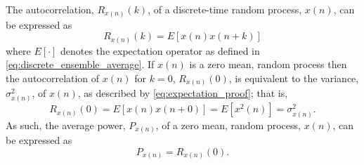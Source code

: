 The autocorrelation, $R_{x(n)}(k)$, of a discrete-time random process, $x(n)$,
can be expressed as
\begin{equation}\label{eq:autocorrelation}
 R_{x(n)}(k)=E\left[x(n)x(n+k)\right]
\end{equation}
where $E[\cdot]$ denotes the expectation operator as defined in
\eqref{eq:discrete_ensemble_average}\cite{hsu_schaums_1996}. If $x(n)$ is a zero mean,
random process then the autocorrelation of $x(n)$ for $k=0$, $R_{x(n)}(0)$, is equivalent
to the variance, $\sigma^2_{x(n)}$, of $x(n)$, as described by
\eqref{eq:expectation_proof}; that is,
\begin{equation}\label{eq:autocorrelation_zero_1}
 R_{x(n)}(0)=E\left[x(n)x(n+0)\right]=E\left[x^2(n)\right]=\sigma^2_{x(n)}\text{.}
\end{equation}
As such, the average power, $P_{x(n)}$, of a zero mean, random process, $x(n)$, can be
expressed as 
\begin{equation}\label{eq:autocorrelation_zero_2}
 P_{x(n)}=R_{x(n)}(0)\text{.}
\end{equation}


